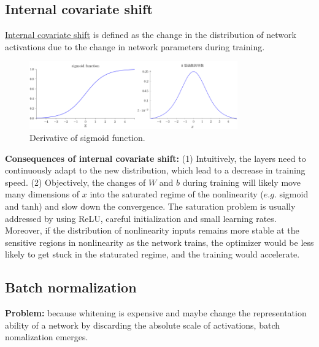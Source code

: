\documentclass[10pt,onecolumn]{book}
\begin{document}

\subsection{Internal covariate shift}
\uline{Internal covariate shift} is defined as the change in the distribution of network activations due to the change in network parameters during training. 


\begin{figure}[h]
\centering
\includegraphics[width=0.8\textwidth]{figures/sigmoid.png}
\caption{Derivative of sigmoid function.}
\end{figure}


\textbf{Consequences of internal covariate shift: }(1) Intuitively, the layers need to continuously adapt to the new distribution, which lead to a decrease in training speed. (2) Objectively, the changes of $W$ and $b$ during training will likely move many dimensions of $x$ into the saturated regime of the nonlinearity ($e.g.$ sigmoid and tanh) and slow down the convergence. The saturation problem is usually addressed by using ReLU, careful initialization and small learning rates. Moreover, if the distribution of nonlinearity inputs remains more stable at the sensitive regions in nonlinearity as the network trains, the optimizer would be less likely to get stuck in the staturated regime, and the training would accelerate.


\subsection{Batch normalization}
\label{sect:batch-normalization}
\textbf{Problem: } because whitening is expensive and maybe change the representation ability of a network by discarding the absolute scale of activations, batch nomalization emerges.
\end{document}
